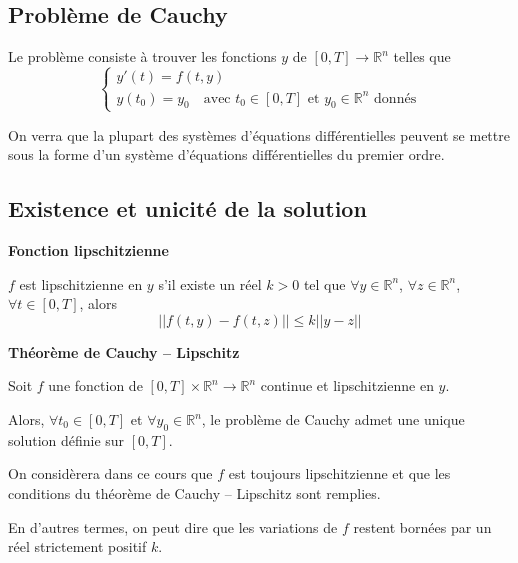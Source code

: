 \documentclass[10pt]{article}
\begin{document}
\subsection{Problème de Cauchy}

\begin{prob}
Le problème consiste à trouver les fonctions $y$ de $[0,T]\rightarrow \mathbb{R}^n$ telles que
$$
\left\{
\begin{array}{l}
y'(t)=f(t,y) \\
y(t_0)=y_0 \quad \text{avec } t_0\in [0,T] \text{ et } y_0\in \mathbb{R}^n \text{ donnés}
\end{array}
\right.
 $$ 
\end{prob}

 
On verra que la plupart des systèmes d'équations différentielles peuvent se mettre sous la forme d'un système d'équations différentielles du premier ordre. 

%
%
\subsection{Existence et unicité de la solution}

\begin{defi}
\textbf{Fonction lipschitzienne}

$f$ est lipschitzienne en $y$ s'il existe un réel $k>0$ tel que $\forall y\in\mathbb{R}^n$, $\forall z\in\mathbb{R}^n$, $\forall t\in[0,T]$, alors 
$$
||f(t,y)-f(t,z)||\leq k||y-z||
$$

\end{defi}

\begin{theo}
\textbf{Théorème de Cauchy -- Lipschitz}

Soit $f$ une fonction de $[0,T] \times \mathbb{R}^n \rightarrow \mathbb{R}^n$ continue et lipschitzienne en $y$. 

Alors, $\forall t_0 \in [0,T]$ et $\forall y_0 \in \mathbb{R}^n$, le problème de Cauchy admet une unique solution définie sur $[0,T]$.

\end{theo}

On considèrera dans ce cours que $f$ est toujours lipschitzienne et que les conditions du théorème de Cauchy -- Lipschitz sont remplies. 

En d'autres termes, on peut dire que les variations de $f$ restent bornées par un réel strictement positif $k$.
\end{document}
